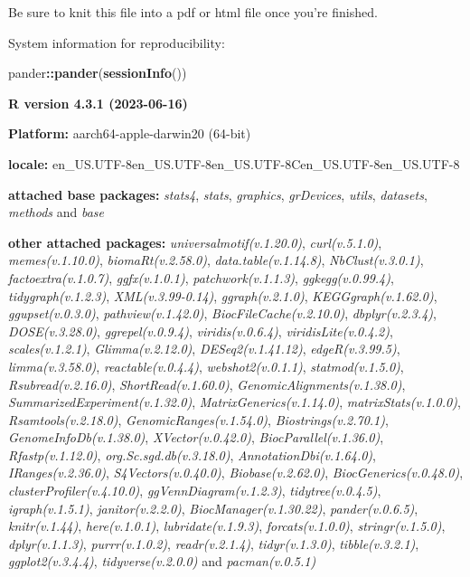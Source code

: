 \documentclass[
]{book}
\newenvironment{Shaded}{\begin{snugshade}}{\end{snugshade}}
\newcommand{\FunctionTok}[1]{\textcolor[rgb]{0.13,0.29,0.53}{\textbf{#1}}}
\newcommand{\NormalTok}[1]{#1}
\newcommand{\SpecialCharTok}[1]{\textcolor[rgb]{0.81,0.36,0.00}{\textbf{#1}}}
\begin{document}
Be sure to knit this file into a pdf or html file once you're finished.

System information for reproducibility:

\begin{Shaded}
\begin{Highlighting}[]
\NormalTok{pander}\SpecialCharTok{::}\FunctionTok{pander}\NormalTok{(}\FunctionTok{sessionInfo}\NormalTok{())}
\end{Highlighting}
\end{Shaded}

\textbf{R version 4.3.1 (2023-06-16)}

\textbf{Platform:} aarch64-apple-darwin20 (64-bit)

\textbf{locale:}
en\_US.UTF-8\textbar\textbar en\_US.UTF-8\textbar\textbar en\_US.UTF-8\textbar\textbar C\textbar\textbar en\_US.UTF-8\textbar\textbar en\_US.UTF-8

\textbf{attached base packages:}
\emph{stats4}, \emph{stats}, \emph{graphics}, \emph{grDevices}, \emph{utils}, \emph{datasets}, \emph{methods} and \emph{base}

\textbf{other attached packages:}
\emph{universalmotif(v.1.20.0)}, \emph{curl(v.5.1.0)}, \emph{memes(v.1.10.0)}, \emph{biomaRt(v.2.58.0)}, \emph{data.table(v.1.14.8)}, \emph{NbClust(v.3.0.1)}, \emph{factoextra(v.1.0.7)}, \emph{ggfx(v.1.0.1)}, \emph{patchwork(v.1.1.3)}, \emph{ggkegg(v.0.99.4)}, \emph{tidygraph(v.1.2.3)}, \emph{XML(v.3.99-0.14)}, \emph{ggraph(v.2.1.0)}, \emph{KEGGgraph(v.1.62.0)}, \emph{ggupset(v.0.3.0)}, \emph{pathview(v.1.42.0)}, \emph{BiocFileCache(v.2.10.0)}, \emph{dbplyr(v.2.3.4)}, \emph{DOSE(v.3.28.0)}, \emph{ggrepel(v.0.9.4)}, \emph{viridis(v.0.6.4)}, \emph{viridisLite(v.0.4.2)}, \emph{scales(v.1.2.1)}, \emph{Glimma(v.2.12.0)}, \emph{DESeq2(v.1.41.12)}, \emph{edgeR(v.3.99.5)}, \emph{limma(v.3.58.0)}, \emph{reactable(v.0.4.4)}, \emph{webshot2(v.0.1.1)}, \emph{statmod(v.1.5.0)}, \emph{Rsubread(v.2.16.0)}, \emph{ShortRead(v.1.60.0)}, \emph{GenomicAlignments(v.1.38.0)}, \emph{SummarizedExperiment(v.1.32.0)}, \emph{MatrixGenerics(v.1.14.0)}, \emph{matrixStats(v.1.0.0)}, \emph{Rsamtools(v.2.18.0)}, \emph{GenomicRanges(v.1.54.0)}, \emph{Biostrings(v.2.70.1)}, \emph{GenomeInfoDb(v.1.38.0)}, \emph{XVector(v.0.42.0)}, \emph{BiocParallel(v.1.36.0)}, \emph{Rfastp(v.1.12.0)}, \emph{org.Sc.sgd.db(v.3.18.0)}, \emph{AnnotationDbi(v.1.64.0)}, \emph{IRanges(v.2.36.0)}, \emph{S4Vectors(v.0.40.0)}, \emph{Biobase(v.2.62.0)}, \emph{BiocGenerics(v.0.48.0)}, \emph{clusterProfiler(v.4.10.0)}, \emph{ggVennDiagram(v.1.2.3)}, \emph{tidytree(v.0.4.5)}, \emph{igraph(v.1.5.1)}, \emph{janitor(v.2.2.0)}, \emph{BiocManager(v.1.30.22)}, \emph{pander(v.0.6.5)}, \emph{knitr(v.1.44)}, \emph{here(v.1.0.1)}, \emph{lubridate(v.1.9.3)}, \emph{forcats(v.1.0.0)}, \emph{stringr(v.1.5.0)}, \emph{dplyr(v.1.1.3)}, \emph{purrr(v.1.0.2)}, \emph{readr(v.2.1.4)}, \emph{tidyr(v.1.3.0)}, \emph{tibble(v.3.2.1)}, \emph{ggplot2(v.3.4.4)}, \emph{tidyverse(v.2.0.0)} and \emph{pacman(v.0.5.1)}
\end{document}
